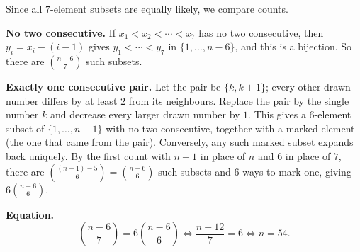 Since all $7$-element subsets are equally likely, we compare counts.

\textbf{No two consecutive.} If $x_1<x_2<\cdots<x_7$ has no two consecutive, then $y_i=x_i-(i-1)$ gives $y_1<\cdots<y_7$ in $\{1,\ldots,n-6\}$, and this is a bijection. So there are $\binom{n-6}{7}$ such subsets.

\textbf{Exactly one consecutive pair.} Let the pair be $\{k,k+1\}$; every other drawn number differs by at least $2$ from its neighbours. Replace the pair by the single number $k$ and decrease every larger drawn number by $1$. This gives a $6$-element subset of $\{1,\ldots,n-1\}$ with no two consecutive, together with a marked element (the one that came from the pair). Conversely, any such marked subset expands back uniquely. By the first count with $n-1$ in place of $n$ and $6$ in place of $7$, there are $\binom{(n-1)-5}{6}=\binom{n-6}{6}$ such subsets and $6$ ways to mark one, giving $6\binom{n-6}{6}$.

\textbf{Equation.}
\[
\binom{n-6}{7}=6\binom{n-6}{6}\iff\dfrac{n-12}{7}=6\iff n=\boxed{54}.
\]
